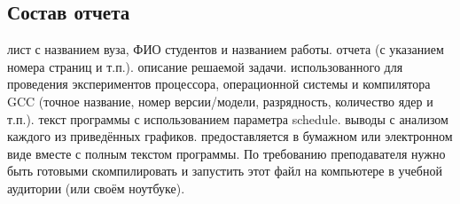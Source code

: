 { %
	\subsection{Состав отчета}
	\begin{enumerate}
		 лист с названием вуза, ФИО студентов и названием работы.
		 отчета (с указанием номера страниц и т.п.).
		 описание решаемой задачи.
		 использованного для проведения экспериментов процессора, операционной системы и компилятора GCC (точное название, номер версии/модели, разрядность, количество ядер и т.п.).
		 текст программы с использованием параметра schedule.
		 выводы с анализом каждого из приведённых графиков.
		 предоставляется в бумажном или электронном виде вместе с полным текстом программы. По требованию преподавателя нужно быть готовыми скомпилировать и запустить этот файл на компьютере в учебной аудитории (или своём ноутбуке).
	\end{enumerate}
}